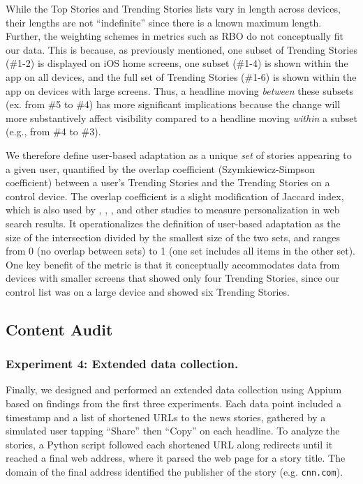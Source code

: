 While the Top Stories and Trending Stories lists vary in length across devices, their lengths are not ``indefinite'' since there is a known maximum length. Further, the weighting schemes in metrics such as RBO do not conceptually fit our data. This is because, as previously mentioned, one subset of Trending Stories (\#1-2) is displayed on iOS home screens, one subset (\#1-4) is shown within the app on all devices, and the full set of Trending Stories (\#1-6) is shown within the app on devices with large screens. Thus, a headline moving \textit{between} these subsets (ex. from \#5 to \#4) has more significant implications because the change will more substantively affect visibility compared to a headline moving \textit{within} a subset (e.g., from \#4 to \#3).

We therefore define user-based adaptation as a unique \textit{set} of stories appearing to a given user, quantified by the overlap coefficient (Szymkiewicz-Simpson coefficient)  \citep{Vijaymeena2016} between a user's Trending Stories and the Trending Stories on a control device. The overlap coefficient is a slight modification of Jaccard index, which is also used by \citet{Hannak}, \citet{Kliman-Silver2015}, \citet{Vincent2019}, and other studies to measure personalization in web search results. It operationalizes the definition of user-based adaptation as the size of the intersection divided by the smallest size of the two sets, and ranges from 0 (no overlap between sets) to 1 (one set includes all items in the other set). One key benefit of the metric is that it conceptually accommodates data from devices with smaller screens that showed only four Trending Stories, since our control list was on a large device and showed six Trending Stories.


\subsection{Content Audit}

\subsubsection{Experiment 4: Extended data collection.}
Finally, we designed and performed an extended data collection using Appium based on findings from the first three experiments. Each data point included a timestamp and a list of shortened URLs to the news stories, gathered by a simulated user tapping ``Share'' then ``Copy'' on each headline. To analyze the stories, a Python script followed each shortened URL along redirects until it reached a final web address, where it parsed the web page for a story title. The domain of the final address identified the publisher of the story (e.g. \texttt{cnn.com}).

